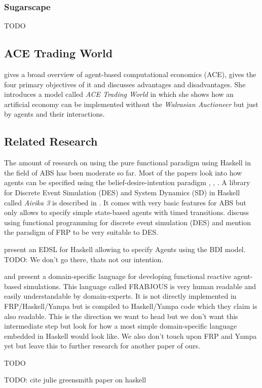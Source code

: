 \subsubsection{Sugarscape}
TODO \cite{epstein_growing_1996} 

\subsection{ACE Trading World}
\cite{tesfatsion_agent-based_2006} gives a broad overview of agent-based computational economics (ACE), gives the four primary objectives of it and discusses advantages and disadvantages. She introduces a model called \textit{ACE Trading World} in which she shows how an artificial economy can be implemented without the \textit{Walrasian Auctioneer} but just by agents and their interactions. 

\subsection{Related Research}
The amount of research on using the pure functional paradigm using Haskell in the field of ABS has been moderate so far.
Most of the papers look into how agents can be specified using the belief-desire-intention paradigm \cite{de_jong_suitability_2014}, \cite{sulzmann_specifying_2007}, \cite{jankovic_functional_2007}.
A library for Discrete Event Simulation (DES) and System Dynamics (SD) in Haskell called \textit{Aivika 3} is described in \cite{sorokin_aivika_2015}. It comes with very basic features for ABS but only allows to specify simple state-based agents with timed transitions.
\cite{jankovic_functional_2007} discuss using functional programming for discrete event simulation (DES) and mention the paradigm of FRP to be very suitable to DES.

\cite{sulzmann_specifying_2007} present an EDSL for Haskell allowing to specify Agents using the BDI model. TODO: We don't go there, thats not our intention. 

\cite{schneider_towards_2012} and \cite{vendrov_frabjous:_2014} present a domain-specific language for developing functional reactive agent-based simulations. This language called FRABJOUS is very human readable and easily understandable by domain-experts. It is not directly implemented in FRP/Haskell/Yampa but is compiled to Haskell/Yampa code which they claim is also readable. This is the direction we want to head but we don't want this intermediate step but look for how a most simple domain-specific language embedded in Haskell would look like. We also don't touch upon FRP and Yampa yet but leave this to further research for another paper of ours.

\cite{klugl_amason:_2013} TODO

TODO: cite julie greensmith paper on haskell
